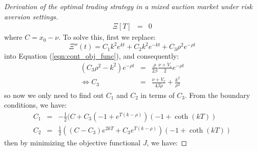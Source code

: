 \begin{proof}[Derivation of the optimal trading strategy in a mixed auction market under risk aversion settings]
\begin{eqnarray}
    \Xi[T] &=& 0
  \end{eqnarray}
  where $C=x_0-\nu$. To solve this, first we replace:
  \[
    \Xi''(t) = C_1 k^2 e^{k t} + C_2 k^2 e^{-k t} + C_3 \rho^2 e^{-\rho t}
  \]
  into Equation (\ref{eqn:cont_obj_func}), and consequently:
  \begin{eqnarray}
    (C_3 \rho^2 - k^2) e^{-\rho t} &=& \frac{\rho}{2\beta} \frac{\nu + V_e}{2} e^{- \rho t} \\
    \Leftrightarrow C_3 &=& \frac{\nu + V_e}{4 \beta \rho} + \frac{k^2}{\rho^2}
  \end{eqnarray}
  so now we only need to find out $C_1$ and $C_2$ in terms of $C_3$. From the boundary conditions, we have:
  \begin{eqnarray}
    C_1 &=& -\frac{1}{2}(C + C_3(-1 + e^{T(k-\rho)})(-1 + \coth(k T)) \\
    C_2 &=& \frac{1}{2}((C - C_3)e^{2kT} + C_3 e^{T(k-\rho)})(-1 + \coth(k T))
  \end{eqnarray}
  then by minimizing the objective functional $J$, we have:


\end{proof}
